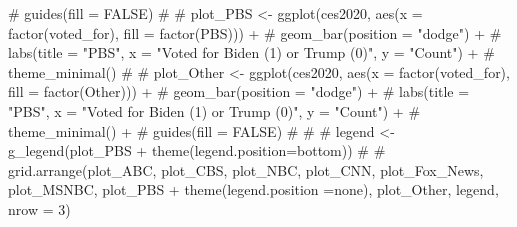 \documentclass[
  letterpaper,
  DIV=11,
  numbers=noendperiod]{scrartcl}
\newenvironment{Shaded}{\begin{snugshade}}{\end{snugshade}}
\newcommand{\CommentTok}[1]{\textcolor[rgb]{0.37,0.37,0.37}{#1}}
\begin{document}
\begin{Shaded}
\begin{Highlighting}[]
\CommentTok{\#   guides(fill = FALSE)}
\CommentTok{\# }
\CommentTok{\# plot\_PBS \textless{}{-} ggplot(ces2020, aes(x = factor(voted\_for), fill = factor(PBS))) +}
\CommentTok{\#   geom\_bar(position = "dodge") +}
\CommentTok{\#   labs(title = "PBS", x = "Voted for Biden (1) or Trump (0)", y = "Count") +}
\CommentTok{\#   theme\_minimal() }
\CommentTok{\# }
\CommentTok{\# plot\_Other \textless{}{-} ggplot(ces2020, aes(x = factor(voted\_for), fill = factor(Other))) +}
\CommentTok{\#   geom\_bar(position = "dodge") +}
\CommentTok{\#   labs(title = "PBS", x = "Voted for Biden (1) or Trump (0)", y = "Count") +}
\CommentTok{\#   theme\_minimal() +}
\CommentTok{\#   guides(fill = FALSE)}
\CommentTok{\# }
\CommentTok{\# }
\CommentTok{\# legend \textless{}{-} g\_legend(plot\_PBS + theme(legend.position=\textquotesingle{}bottom\textquotesingle{}))}
\CommentTok{\# }
\CommentTok{\# grid.arrange(plot\_ABC, plot\_CBS, plot\_NBC, plot\_CNN, plot\_Fox\_News, plot\_MSNBC, plot\_PBS + theme(legend.position =\textquotesingle{}none\textquotesingle{}), plot\_Other, legend, nrow = 3)}
\end{Highlighting}
\end{Shaded}
\end{document}
